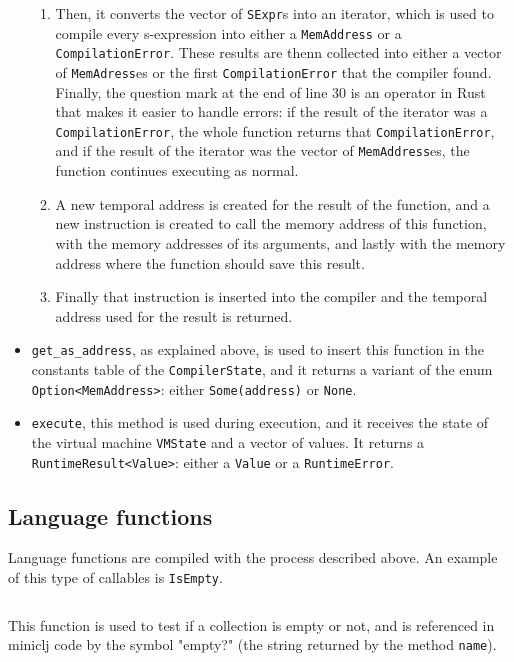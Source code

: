 \documentclass[11pt]{scrreprt}
\begin{document}
\begin{itemize}
\begin{enumerate}
    \item Then, it converts the vector of \texttt{SExpr}s into an iterator, which is used to compile every s-expression into either a \texttt{MemAddress} or a \texttt{CompilationError}. These results are thenn collected into either a vector of \texttt{MemAdress}es or the first \texttt{CompilationError} that the compiler found. Finally, the question mark at the end of line 30 is an operator in Rust that makes it easier to handle errors: if the result of the iterator was a \texttt{CompilationError}, the whole function returns that \texttt{CompilationError}, and if the result of the iterator was the vector of \texttt{MemAddress}es, the function continues executing as normal.
    \item A new temporal address is created for the result of the function, and a new instruction is created to call the memory address of this function, with the memory addresses of its arguments, and lastly with the memory address where the function should save this result.
    \item Finally that instruction is inserted into the compiler and the temporal address used for the result is returned.
  \end{enumerate}
  \item \texttt{get\_as\_address}, as explained above, is used to insert this function in the constants table of the \texttt{CompilerState}, and it returns a variant of the enum \texttt{Option<MemAddress>}: either \texttt{Some(address)} or \texttt{None}.
  \item \texttt{execute}, this method is used during execution, and it receives the state of the virtual machine \texttt{VMState} and a vector of values. It returns a \texttt{RuntimeResult<Value>}: either a \texttt{Value} or a \texttt{RuntimeError}.
\end{itemize}

\subsection{Language functions}
Language functions are compiled with the process described above. An example of this type of callables is \texttt{IsEmpty}.

\inputminted[firstline=268,lastline=316]{rust}{/home/mario/git/MarioJim/miniclj/miniclj-lib/src/callables/collection/access.rs}

This function is used to test if a collection is empty or not, and is referenced in miniclj code by the symbol "empty?" (the string returned by the method \texttt{name}).
\end{document}
